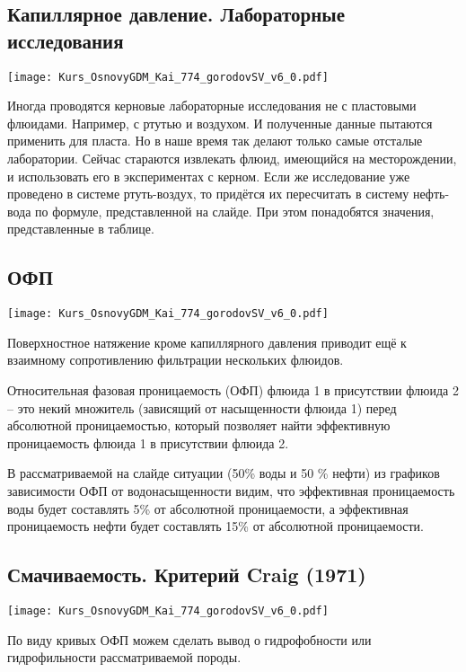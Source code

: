 \documentclass[main.tex]{subfiles}
\begin{document}
\subsection{Капиллярное давление. Лабораторные исследования}

\texttt{[image: Kurs\_OsnovyGDM\_Kai\_774\_gorodovSV\_v6\_0.pdf]}

Иногда проводятся керновые лабораторные исследования не с пластовыми флюидами.
Например, с ртутью и воздухом.
И полученные данные пытаются применить для пласта.
Но в наше время так делают только самые отсталые лаборатории.
Сейчас стараются извлекать флюид, имеющийся на месторождении, и использовать его в экспериментах с керном.
Если же исследование уже проведено в системе ртуть-воздух, то придётся их пересчитать в систему нефть-вода по формуле, представленной на слайде.
При этом понадобятся значения, представленные в таблице.

\subsection{ОФП}

\texttt{[image: Kurs\_OsnovyGDM\_Kai\_774\_gorodovSV\_v6\_0.pdf]}

Поверхностное натяжение кроме капиллярного давления приводит ещё к взаимному сопротивлению фильтрации нескольких флюидов.

Относительная фазовая проницаемость (ОФП) флюида 1 в присутствии флюида 2 -- это некий множитель (зависящий от насыщенности флюида 1) перед абсолютной проницаемостью, который позволяет найти эффективную проницаемость флюида 1 в присутствии флюида 2.

В рассматриваемой на слайде ситуации (50\% воды и 50 \% нефти) из графиков зависимости ОФП от водонасыщенности видим, что эффективная проницаемость воды будет составлять 5\% от абсолютной проницаемости, а эффективная проницаемость нефти будет составлять 15\% от абсолютной проницаемости.

\subsection{Смачиваемость. Критерий Craig (1971)}

\texttt{[image: Kurs\_OsnovyGDM\_Kai\_774\_gorodovSV\_v6\_0.pdf]}

По виду кривых ОФП можем сделать вывод о гидрофобности или гидрофильности рассматриваемой породы.
\end{document}
